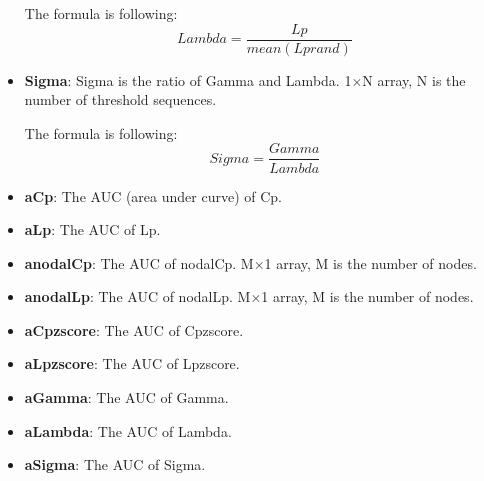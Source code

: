 \documentclass[11pt]{article}
\begin{document}
\begin{itemize}
						The formula is following:
						$$Lambda=\frac{Lp}{mean(Lprand)}$$
					\item \textbf{Sigma}: Sigma is the ratio of Gamma and Lambda.
						1$\times$N array, N is the number of threshold sequences.
						
						The formula is following:
						$$Sigma=\frac{Gamma}{Lambda}$$
					\item \textbf{aCp}: The AUC (area under curve) of Cp.
					\item \textbf{aLp}: The AUC of Lp.
					\item \textbf{anodalCp}: The AUC of nodalCp.
						M$\times$1 array, M is the number of nodes.
					\item \textbf{anodalLp}: The AUC of nodalLp.
						M$\times$1 array, M is the number of nodes.
					\item \textbf{aCpzscore}: The AUC of Cpzscore.
					\item \textbf{aLpzscore}: The AUC of Lpzscore.
					\item \textbf{aGamma}: The AUC of Gamma.
					\item \textbf{aLambda}: The AUC of Lambda.
					\item \textbf{aSigma}: The AUC of Sigma.
				\end{itemize}
\end{document}

